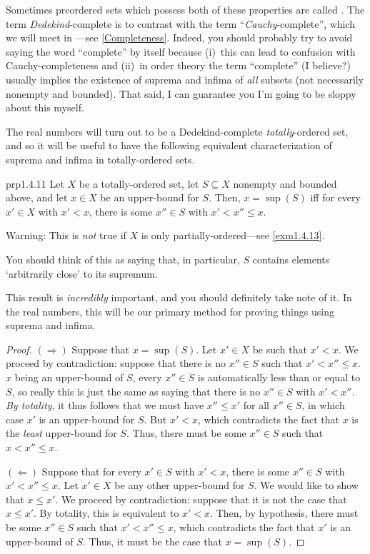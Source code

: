 \begin{rmk}
Sometimes preordered sets which possess both of these properties are called .  The term \emph{Dedekind}-complete is to contrast with the term ``\emph{Cauchy}-complete'', which we will meet in ---see \cref{Completeness}.  Indeed, you should probably try to avoid saying the word ``complete'' by itself because (i)~this can lead to confusion with Cauchy-completeness and (ii)~in order theory the term ``complete'' (I believe?) usually implies the existence of suprema and infima of \emph{all} subsets (not necessarily nonempty and bounded).  That said, I can guarantee you I'm going to be sloppy about this myself.
\end{rmk}

The real numbers will turn out to be a Dedekind-complete \emph{totally}-ordered set, and so it will be useful to have the following equivalent characterization of suprema and infima in totally-ordered sets.
\begin{prp}{}{prp1.4.11}
Let $X$ be a totally-ordered set, let $S\subseteq X$ nonempty and bounded above, and let $x\in X$ be an upper-bound for $S$.  Then, $x=\sup (S)$ iff for every $x'\in X$ with $x'<x$, there is some $x''\in S$ with $x'<x''\leq x$.
\begin{wrn}
Warning:  This is \emph{not} true if $X$ is only partially-ordered---see \cref{exm1.4.13}.
\end{wrn}
\begin{rmk}
You should think of this as saying that, in particular, $S$ contains elements `arbitrarily close' to its supremum.
\end{rmk}
\begin{rmk}
This result is \emph{incredibly} important, and you should definitely take note of it.  In the real numbers, this will be our primary method for proving things using suprema and infima.
\end{rmk}
\begin{proof}
$(\Rightarrow )$ Suppose that $x=\sup (S)$.  Let $x'\in X$ be such that $x'<x$.  We proceed by contradiction:  suppose that there is no $x''\in S$ such that $x'<x''\leq x$.  $x$ being an upper-bound of $S$, every $x''\in S$ is automatically less than or equal to $S$, so really this is just the same as saying that there is no $x''\in S$ with $x'<x''$.  \emph{By totality}, it thus follows that we must have $x''\leq x'$ for all $x''\in S$, in which case $x'$ is an upper-bound for $S$.  But $x'<x$, which contradicts the fact that $x$ is the \emph{least} upper-bound for $S$.  Thus, there must be some $x''\in S$ such that $x<x''\leq x$.

\blankline
\noindent
$(\Leftarrow )$ Suppose that for every $x'\in S$ with $x'<x$, there is some $x''\in S$ with $x'<x''\leq x$.  Let $x'\in X$ be any other upper-bound for $S$.  We would like to show that $x\leq x'$.  We proceed by contradiction:  suppose that it is not the case that $x\leq x'$.  By totality, this is equivalent to $x'<x$.  Then, by hypothesis, there must be some $x''\in S$ such that $x'<x''\leq x$, which contradicts the fact that $x'$ is an upper-bound of $S$.  Thus, it must be the case that $x=\sup (S)$.
\end{proof}
\end{prp}
